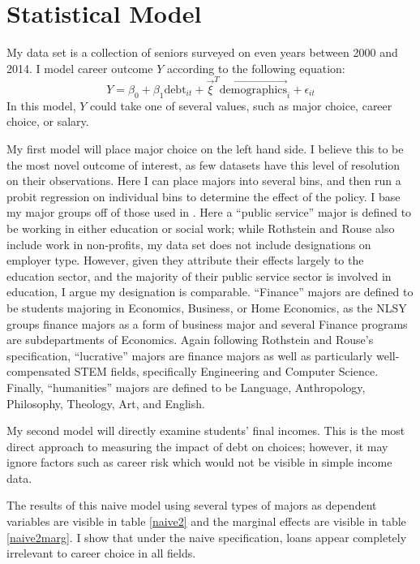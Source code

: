 \documentclass[12pt]{article}
\begin{document}
	\section{Statistical Model}
	
	My data set is a collection of seniors surveyed on even years between 2000 and 2014. I model career outcome $Y$ according to the following equation: 
	\begin{equation}
	Y = \beta_0 + \beta_1 \mbox{debt}_{it} + \vec{\xi}^T \vec{\mbox{demographics}}_i + \epsilon_{it} \label{naiveeq}
	\end{equation} 
	In this model, $Y$ could take one of several values, such as major choice, career choice, or salary. 
	
	My first model will place major choice on the left hand side. I believe this to be the most novel outcome of interest, as few datasets have this level of resolution on their observations. Here I can place majors into several bins, and then run a probit regression on individual bins to determine the effect of the policy. I base my major groups off of those used in \textcite{rothstein2011}. Here a ``public service'' major is defined to be working in either education or social work; while Rothstein and Rouse also include work in non-profits, my data set does not include designations on employer type. However, given they attribute their effects largely to the education sector, and the majority of their public service sector is involved in education, I argue my designation is comparable. ``Finance'' majors are defined to be students majoring in Economics, Business, or Home Economics, as the NLSY groups finance majors as a form of business major and several Finance programs are subdepartments of Economics. Again following Rothstein and Rouse's specification, ``lucrative'' majors are finance majors as well as particularly well-compensated STEM fields, specifically Engineering and Computer Science. Finally, ``humanities'' majors are defined to be Language, Anthropology, Philosophy, Theology, Art, and English.
	
	My second model will directly examine students' final incomes. This is the most direct approach to measuring the impact of debt on choices; however, it may ignore factors such as career risk which would not be visible in simple income data.
	
	The results of this naive model using several types of majors as dependent variables are visible in table \ref{naive2} and the marginal effects are visible in table \ref{naive2marg}. I show that under the naive specification, loans appear completely irrelevant to career choice in all fields.
	
\end{document}
